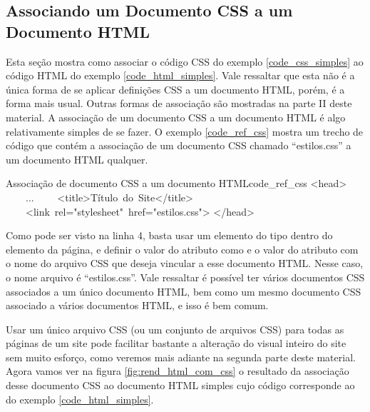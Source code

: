\subsection{Associando um Documento CSS a um Documento HTML}

Esta seção mostra como associar o código CSS do exemplo \ref{code_css_simples} ao código HTML do exemplo \ref{code_html_simples}. Vale ressaltar que esta não é a única forma de se aplicar definições CSS a um documento HTML, porém, é a forma mais usual. Outras formas de associação são mostradas na parte II deste material. A associação de um documento CSS a um documento HTML é algo relativamente simples de se fazer. O exemplo \ref{code_ref_css} mostra um trecho de código que contém a associação de um documento CSS chamado ``estilos.css'' a um documento HTML qualquer. 

\begin{csscode}{Associação de documento CSS a um documento HTML}{code_ref_css}
<head>
    ...
    <title>Título do Site</title>
    <link rel="stylesheet" href="estilos.css">
</head>
\end{csscode}

Como pode ser visto na linha 4, basta usar um elemento do tipo  dentro do elemento  da página, e definir o valor do atributo  como  e o valor do atributo  com o nome do arquivo CSS que deseja vincular a esse documento HTML. Nesse caso, o nome arquivo é ``estilos.css''. Vale ressaltar é possível ter vários documentos CSS associados a um único documento HTML, bem como um mesmo documento CSS associado a vários documentos HTML, e isso é bem comum.

Usar um único arquivo CSS (ou um conjunto de arquivos CSS) para todas as páginas de um site pode facilitar bastante a alteração do visual inteiro do site sem muito esforço, como veremos mais adiante na segunda parte deste material. Agora vamos ver na figura \ref{fig:rend_html_com_css} o resultado da associação desse documento CSS ao documento HTML simples cujo código corresponde ao do exemplo \ref{code_html_simples}.

